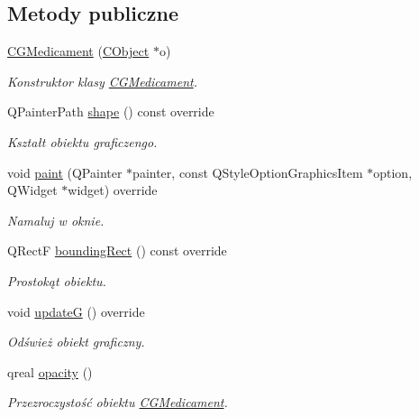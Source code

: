 \subsection*{Metody publiczne}
\begin{DoxyCompactItemize}
\item 
\mbox{\hyperlink{class_c_g_medicament_a70ac1464fc214103040579473630b518}{C\+G\+Medicament}} (\mbox{\hyperlink{class_c_object}{C\+Object}} $\ast$o)
\begin{DoxyCompactList}\small\item\em Konstruktor klasy \mbox{\hyperlink{class_c_g_medicament}{C\+G\+Medicament}}. \end{DoxyCompactList}\item 
Q\+Painter\+Path \mbox{\hyperlink{class_c_g_medicament_ad0f12464f4daf21436ced32d02994db0}{shape}} () const override
\begin{DoxyCompactList}\small\item\em Kształt obiektu graficzengo. \end{DoxyCompactList}\item 
void \mbox{\hyperlink{class_c_g_medicament_a833735e523952b5e5867ff36d18e95b5}{paint}} (Q\+Painter $\ast$painter, const Q\+Style\+Option\+Graphics\+Item $\ast$option, Q\+Widget $\ast$widget) override
\begin{DoxyCompactList}\small\item\em Namaluj w oknie. \end{DoxyCompactList}\item 
Q\+RectF \mbox{\hyperlink{class_c_g_medicament_aa64c33d0aced10421c734961cfdd8344}{bounding\+Rect}} () const override
\begin{DoxyCompactList}\small\item\em Prostokąt obiektu. \end{DoxyCompactList}\item 
void \mbox{\hyperlink{class_c_g_medicament_a08f2afb7a94b989f81971384ce84c805}{updateG}} () override
\begin{DoxyCompactList}\small\item\em Odśwież obiekt graficzny. \end{DoxyCompactList}\item 
qreal \mbox{\hyperlink{class_c_g_medicament_a17c3b841c5fde02907d194889d87abe2}{opacity}} ()
\begin{DoxyCompactList}\small\item\em Przezroczystość obiektu \mbox{\hyperlink{class_c_g_medicament}{C\+G\+Medicament}}. \end{DoxyCompactList}\end{DoxyCompactItemize}
